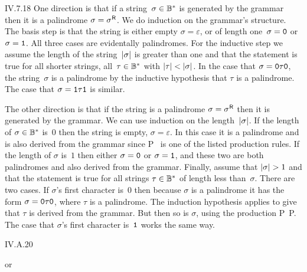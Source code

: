 \begin{ans}{IV.7.18}
One direction is that if a string~$\sigma\in{{\mathbb{B}}^{*}}$
is generated by the grammar then it is a palindrome $\sigma={{\sigma}^{{\mskip 1mu}\textsf{R}}}$.
We do induction on the grammar's structure.
The basis step is that the string is either empty $\sigma=\varepsilon$,
or of length one~$\sigma=\texttt{0}$ or $\sigma=\texttt{1}$.
All three cases are evidentally palindromes.
For the inductive step we assume the length of the
string~$|\sigma|$ is greater than one and that the statement is true for all
shorter strings, all~$\tau\in{{\mathbb{B}}^{*}}$ with $\lh{\tau}<\lh{\sigma}$.
In the case that $\sigma=\texttt{0}\tau\texttt{0}$, the string~$\sigma$ is a
palindrome by the inductive hypothesis that $\tau$ is a palindrome.
The case that $\sigma=\texttt{1}\tau\texttt{1}$ is similar.

The other direction is that if the string is a palindrome
$\sigma={{\sigma}^{{\mskip 1mu}\textsf{R}}}$ then it is generated by the grammar.
We can use induction on the length~$|\sigma|$.
If the length of $\sigma\in{{\mathbb{B}}^{*}}$ is~$0$ then the string
is empty, $\sigma=\varepsilon$.
In this case it is a palindrome and is also derived from the grammar since
\mbox{P \produces{} \emptystring} is one of the listed production rules.
If the length of $\sigma$ is~$1$ then either $\sigma=\texttt{0}$ or
$\sigma=\texttt{1}$, and these two are both palindromes and also derived from
the grammar.
Finally, assume that $\lh{\sigma}>1$ and that the statement is true for all
strings $\tau\in{{\mathbb{B}}^{*}}$ of length less than~$\sigma$.
There are two cases.
If $\sigma$'s first character is~$0$ then because $\sigma$ is a palindrome
it has the form $\sigma=\texttt{0}\tau\texttt{0}$, where $\tau$ is a palindrome.
The induction hypothesis applies to give that $\tau$ is derived from the
grammar.
But then so is $\sigma$, using the production
\mbox{P \produces{} P}.
The case that $\sigma$'s first character is~$\texttt{1}$ works the same way.
\end{ans}
%
%
%
%
%
%
%
\begin{ans}{IV.A.20}
\begin{exparts}
\item {}
\item {}
\item {}
\item {}
\item {}
\item {}
   or 
\end{exparts}
\end{ans}
